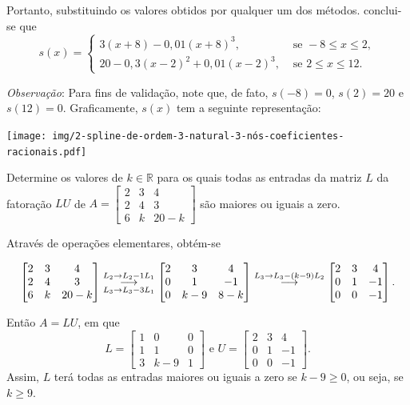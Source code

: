 \documentclass[12pt,a4paper]{article}
\newcommand*\R{\mathbb{R}}
\newcommand{\grstep}[2][\relax]{%
   \ensuremath{\mathrel{
       {\mathop{\longrightarrow}\limits^{#2\mathstrut}_{
                                     \begin{subarray}{l} #1 \end{subarray}}}}}}
\begin{document}
\begin{ExerciseList}
Portanto, substituindo os valores obtidos por qualquer um dos métodos. conclui-se que
\[
  s(x) =
  \begin{cases}
    3 (x + 8) - 0,01(x + 8)^3, & \text{ se } -8 \leq x \leq 2,\\
    20 - 0,3(x - 2)^2 + 0,01(x - 2)^3, & \text{ se } 2 \leq x \leq 12.
  \end{cases}
\]


\textit{Observação}: Para fins de validação, note que, de fato, $s(-8) = 0$, $s(2) = 20$ e $s(12) = 0$. Graficamente, $s(x)$ tem a seguinte representação:

\begin{center}
  \texttt{[image: img/2-spline-de-ordem-3-natural-3-nós-coeficientes-racionais.pdf]}
\end{center}


\Exercise[title={2,0}] Determine os valores de $k \in \R$ para os quais todas as entradas da matriz $L$ da fatoração $LU$ de $A=\begin{bmatrix}
  2 & 3 & 4 \\
  2 & 4 & 3 \\
  6 & k & 20 -k
\end{bmatrix}$ são maiores ou iguais a zero.

\Answer Através de operações elementares, obtém-se

\[
\begin{bmatrix}
  2 & 3 & 4 \\
  2 & 4 & 3 \\
  6 & k & 20 -k
\end{bmatrix}
\grstep[L_3 \to L_3 -3 L_1]{L_2 \to L_2 - 1 L_1}
\begin{bmatrix}
  2 & 3 & 4 \\
  0 & 1 & -1 \\
  0 & k-9 & 8 -k
\end{bmatrix}
\grstep{L_3 \to L_3 -(k-9)L_2}
\begin{bmatrix}
  2 & 3 & 4 \\
  0 & 1 & -1 \\
  0 & 0 & -1
\end{bmatrix}.
\]

Então $A = LU$, em que
\[
L =
\begin{bmatrix}
1 & 0 & 0 \\
1 & 1 & 0 \\
3 & k - 9 & 1
\end{bmatrix}
\text{ e }
U =
\begin{bmatrix}
2 & 3 & 4 \\
0 & 1 & -1 \\
0 & 0 & -1
\end{bmatrix}.
\]
Assim, $L$ terá todas as entradas maiores ou iguais a zero se $k - 9 \geq 0$, ou seja, se $k \geq 9$.


\end{ExerciseList}
\end{document}
